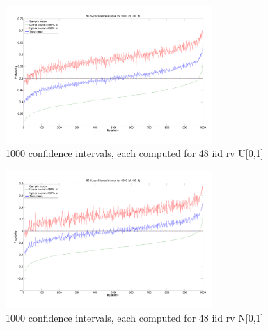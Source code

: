 \documentclass[10pt]{article}
\begin{document}
\begin{figure}[h!]
  \centering
  \includegraphics[width = 0.7\textwidth]{images/hw1_2_c_uni}
  \caption{1000 confidence intervals, each computed for 48 iid rv U[0,1]}
  \label{fig:ci_mean_1000}
\end{figure}

\clearpage

\begin{figure}[htp]
  \centering
  \includegraphics[width = 0.7\textwidth]{images/hw1_2_c}
  \caption{1000 confidence intervals, each computed for 48 iid rv N[0,1]}
  \label{fig:ci_mean_1000_norm}
\end{figure}
\end{document}
